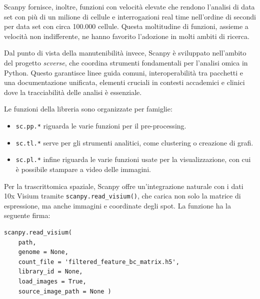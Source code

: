 Scanpy fornisce, inoltre, funzioni con velocità elevate che rendono l'analisi di 
data set con più di un milione di cellule e interrogazioni real time nell'ordine di secondi per data set con circa 100.000 cellule.
Questa moltitudine di funzioni, assieme a velocità non indifferente, ne hanno favorito l'adozione in molti ambiti di ricerca.\cite{scanPyUsage}

Dal punto di vista della manutenibilità invece, Scanpy è sviluppato nell'ambito del progetto \textit{scverse}, 
che coordina strumenti fondamentali per l'analisi omica in Python. 
Questo garantisce linee guida comuni, interoperabilità tra pacchetti e una documentazione unificata, 
elementi cruciali in contesti accademici e clinici dove la tracciabilità delle analisi è essenziale.\cite{scverse}

\medskip
\noindent
Le funzioni della libreria sono organizzate per famiglie:
\begin{itemize}
	\item \texttt{sc.pp.*} riguarda le varie funzioni per il pre-processing.
	\item \texttt{sc.tl.*} serve per gli strumenti analitici, come clustering o creazione di grafi.
	\item \texttt{sc.pl.*} infine riguarda le varie funzioni usate per la visualizzazione, con cui è possibile stampare a video delle immagini.
\end{itemize}

\noindent
Per la trascrittomica spaziale, 
Scanpy offre un'integrazione naturale con i dati 10x Visium tramite 
\texttt{scanpy.read\_visium()}, che carica non solo la matrice di espressione, ma anche immagini e coordinate degli spot. 
La funzione ha la seguente firma:

\begin{center}
\begin{minipage}{8cm}
\begin{verbatim}
scanpy.read_visium(
    path,
    genome = None,
    count_file = 'filtered_feature_bc_matrix.h5',
    library_id = None,
    load_images = True,
    source_image_path = None )
\end{verbatim}
\end{minipage}
\end{center}

